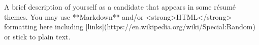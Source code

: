 


\begin{cvparagraph}
A brief description of yourself as a candidate that appears in some résumé themes. You may use **Markdown** and/or <strong>HTML</strong> formatting here including [links](https://en.wikipedia.org/wiki/Special:Random) or stick to plain text.
\end{cvparagraph}

